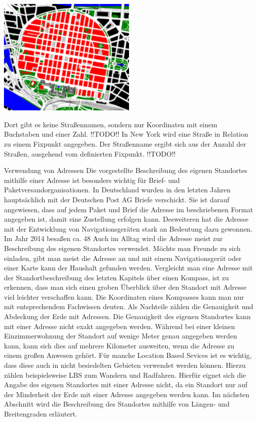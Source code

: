 \includegraphics[width=0.50\textwidth]{ref/images/quadratemannheim.png}

Dort gibt es keine Straßennamen, sondern nur Koordinaten mit einem Buchstaben und einer Zahl.
!!TODO!! In New York wird eine Straße in Relation zu einem Fixpunkt angegeben. Der Straßenname ergibt sich aus der Anzahl der Straßen, ausgehend vom definierten Fixpunkt. !!TODO!! 



Verwendung von Adressen
Die vorgestellte Beschreibung des eigenen Standortes mithilfe einer Adresse ist besonders wichtig für Brief- und Paketversandorganisationen. In Deutschland wurden in den letzten Jahren hauptsächlich mit der Deutschen Post AG Briefe verschickt. Sie ist darauf angewiesen, dass auf jedem Paket und Brief die Adresse im beschriebenen Format angegeben ist, damit eine Zustellung erfolgen kann.
Desweiteren hat die Adresse mit der Entwicklung von Navigationsgeräten stark an Bedeutung dazu gewonnen. Im Jahr 2014 besaßen ca. 48%
Auch im Alltag wird die Adresse meist zur Beschreibung des eigenen Standortes verwendet. Möchte man Freunde zu sich einladen, gibt man meist die Adresse an und mit einem Navigationsgerät oder einer Karte kann der Haushalt gefunden werden.
Vergleicht man eine Adresse mit der Standortbeschreibung des letzten Kapitels über einen Kompass, ist zu erkennen, dass man sich einen groben Überblick über den Standort mit Adresse viel leichter verschaffen kann. Die Koordinaten eines Kompasses kann man nur mit entsprechendem Fachwissen deuten. 
Als Nachteile zählen die Genauigkeit und Abdeckung der Erde mit Adressen. Die Genauigkeit des eigenen Standortes kann mit einer Adresse nicht exakt angegeben werden. Während bei einer kleinen Einzimmerwohnung der Standort auf wenige Meter genau angegeben werden kann, kann sich dies auf mehrere Kilometer ausweiten, wenn die Adresse zu einem großen Anwesen gehört. Für manche Location Based Sevices ist es wichtig, dass diese auch in nicht besiedelten Gebieten verwendet werden können. Hierzu zählen beispielsweise LBS zum Wandern und Radfahren. Hierfür eignet sich die Angabe des eigenen Standortes mit einer Adresse nicht, da ein Standort nur auf der Minderheit der Erde mit einer Adresse angegeben werden kann. 
Im nächsten Abschnitt wird die Beschreibung des Standortes mithilfe von Längen- und Breitengraden erläutert.

